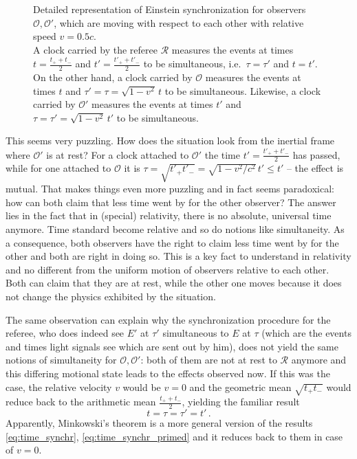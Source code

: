 {\begin{figure}
\caption{Detailed representation of Einstein synchronization for observers $\mathcal{O}, \mathcal{O}'$, which are moving with respect to each other with relative speed $v = 0.5 c$.\\
A clock carried by the referee $\mathcal{R}$ measures the events at times $t = \frac{t_+ + t_-}{2}$ and $t' = \frac{t'_+ + t'_-}{2}$ to be simultaneous, i.e.~$\tau = \tau'$ and $t = t'$.\protect\footnotemark\\
On the other hand, a clock carried by $\mathcal{O}$ measures the events at times $t$ and $\tau' = \tau = \sqrt{1 - v^2} \, t$ to be simultaneous. Likewise, a clock carried by $\mathcal{O}'$ measures the events at times $t'$ and $\tau = \tau' = \sqrt{1 - v^2} \, t'$ to be simultaneous.}
\end{figure}

}
\fi



This seems very puzzling. How does the situation look from the inertial frame where $\mathcal{O}'$ is at rest? For a clock attached to $\mathcal{O}'$ the time $t' = \frac{t'_+ + t'_-}{2}$ has passed, while for one attached to $\mathcal{O}$ it is $\tau = \sqrt{t'_+ t'_-} = \sqrt{1 - v^2 / c^2} \, t' \leq t'$ -- the effect is mutual. That makes things even more puzzling and in fact seems paradoxical: how can both claim that less time went by for the other observer? The answer lies in the fact that in (special) relativity, there is no absolute, universal time anymore. Time standard become relative and so do notions like simultaneity. As a consequence, both observers have the right to claim less time went by for the other and both are right in doing so. This is a key fact to understand in relativity and no different from the uniform motion of observers relative to each other. Both can claim that they are at rest, while the other one moves because it does not change the physics exhibited by the situation.


The same observation can explain why the synchronization procedure for the referee, who does indeed see $E'$ at $\tau'$ simultaneous to $E$ at $\tau$ (which are the events and times light signals see which are sent out by him), does not yield the same notions of simultaneity for $\mathcal{O}, \mathcal{O}'$: both of them are not at rest to $\mathcal{R}$ anymore and this differing motional state leads to the effects observed now. If this was the case, the relative velocity $v$ would be $v = 0$ and the geometric mean $\sqrt{t_+ t_-}$ would reduce back to the arithmetic mean $\frac{t_+ + t_-}{2}$, yielding the familiar result
\begin{equation}
t = \tau = \tau' = t' \, .
\end{equation}
Apparently, Minkowski's theorem is a more general version of the results \eqref{eq:time_synchr}, \eqref{eq:time_synchr_primed} and it reduces back to them in case of $v = 0$.



